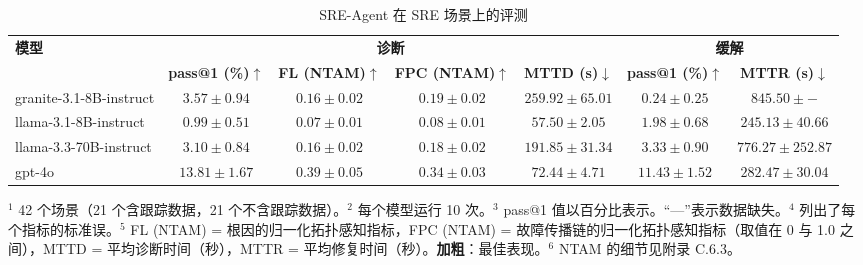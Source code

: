 \begin{table}[H]
\centering
\caption{SRE-Agent 在 SRE 场景上的评测}
\label{tab:itb-sre}
\begin{adjustbox}{max width=\linewidth}
\begin{tabular}{lcccc cc}
\toprule
\multirow{2}{*}{\textbf{模型}} & \multicolumn{4}{c}{\textbf{诊断}} & \multicolumn{2}{c}{\textbf{缓解}} \\
\cmidrule(lr){2-5} \cmidrule(lr){6-7}
 & \textbf{pass@1 (\%)}$\uparrow$ & \textbf{FL (NTAM)}$\uparrow$ & \textbf{FPC (NTAM)}$\uparrow$ & \textbf{MTTD (s)}$\downarrow$ & \textbf{pass@1 (\%)}$\uparrow$ & \textbf{MTTR (s)}$\downarrow$ \\
\midrule
granite-3.1-8B-instruct & $3.57 \pm 0.94$ & $0.16 \pm 0.02$ & $0.19 \pm 0.02$ & $259.92 \pm 65.01$ & $0.24 \pm 0.25$ & $845.50 \pm {-}$ \\
llama-3.1-8B-instruct & $0.99 \pm 0.51$ & $0.07 \pm 0.01$ & $0.08 \pm 0.01$ & $57.50 \pm 2.05$ & $1.98 \pm 0.68$ & $245.13 \pm 40.66$ \\
llama-3.3-70B-instruct & $3.10 \pm 0.84$ & $0.16 \pm 0.02$ & $0.18 \pm 0.02$ & $191.85 \pm 31.34$ & $3.33 \pm 0.90$ & $776.27 \pm 252.87$ \\
gpt-4o & $\mathbf{13.81 \pm 1.67}$ & $\mathbf{0.39 \pm 0.05}$ & $\mathbf{0.34 \pm 0.03}$ & $72.44 \pm 4.71$ & $\mathbf{11.43 \pm 1.52}$ & $282.47 \pm 30.04$ \\
\bottomrule
\end{tabular}
\end{adjustbox}

{\footnotesize
\noindent $^1$ 42 个场景（21 个含跟踪数据，21 个不含跟踪数据）。\quad $^2$ 每个模型运行 10 次。\quad $^3$ pass@1 值以百分比表示。\quad “{---}”表示数据缺失。\quad $^4$ 列出了每个指标的标准误。\quad $^5$ FL (NTAM) = 根因的归一化拓扑感知指标，FPC (NTAM) = 故障传播链的归一化拓扑感知指标（取值在 0 与 1.0 之间），MTTD = 平均诊断时间（秒），MTTR = 平均修复时间（秒）。\textbf{加粗}：最佳表现。\quad $^6$ NTAM 的细节见附录 C.6.3。
\par}
\end{table}

